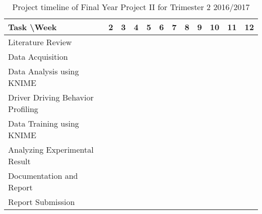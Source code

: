 \begin{table}[h!]
\begin{tabular}{|l|c|c|c|c|c|c|c|c|c|c|c|}
\hline
Task \textbackslash Week & 2 & 3 & 4 & 5 & 6 & 7 & 8 & 9 & 10 & 11 & 12 \\

\hline
Literature Review & \cellcolor[HTML]{000000} & \cellcolor[HTML]{000000} & \cellcolor[HTML]{000000} & & & & & & & &\\

\hline
Data Acquisition &  \cellcolor[HTML]{000000} & \cellcolor[HTML]{000000} & \cellcolor[HTML]{000000} & \cellcolor[HTML]{000000} & \cellcolor[HTML]{000000} & & & & & & \\

\hline
Data Analysis using KNIME & & & & & \cellcolor[HTML]{000000} & \cellcolor[HTML]{000000} & & & & & \\

\hline
Driver Driving Behavior Profiling & & & & & & & \cellcolor[HTML]{000000} & \cellcolor[HTML]{000000} &  & &\\

\hline
Data Training using KNIME & & & & & & & & \cellcolor[HTML]{000000} & \cellcolor[HTML]{000000} &  & \\

\hline
Analyzing Experimental Result & & & & & & & & & \cellcolor[HTML]{000000} & \cellcolor[HTML]{000000} & \\

\hline
Documentation and Report & & & & & & & & & \cellcolor[HTML]{000000} & \cellcolor[HTML]{000000} & \cellcolor[HTML]{000000} \\

\hline
Report Submission & & & & & & & & & & & \cellcolor[HTML]{000000}\\

\hline
\end{tabular}
\label{tbl:gantt2}
\caption{Project timeline of Final Year Project II for Trimester 2 2016/2017}
\end{table}